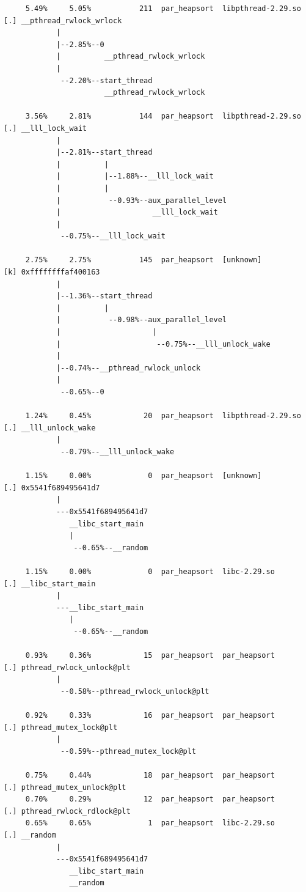 \documentclass{article}
\begin{document}
\begin{verbatim}
     5.49%     5.05%           211  par_heapsort  libpthread-2.29.so  [.] __pthread_rwlock_wrlock
            |
            |--2.85%--0
            |          __pthread_rwlock_wrlock
            |
             --2.20%--start_thread
                       __pthread_rwlock_wrlock

     3.56%     2.81%           144  par_heapsort  libpthread-2.29.so  [.] __lll_lock_wait
            |
            |--2.81%--start_thread
            |          |
            |          |--1.88%--__lll_lock_wait
            |          |
            |           --0.93%--aux_parallel_level
            |                     __lll_lock_wait
            |
             --0.75%--__lll_lock_wait

     2.75%     2.75%           145  par_heapsort  [unknown]           [k] 0xffffffffaf400163
            |
            |--1.36%--start_thread
            |          |
            |           --0.98%--aux_parallel_level
            |                     |
            |                      --0.75%--__lll_unlock_wake
            |
            |--0.74%--__pthread_rwlock_unlock
            |
             --0.65%--0

     1.24%     0.45%            20  par_heapsort  libpthread-2.29.so  [.] __lll_unlock_wake
            |
             --0.79%--__lll_unlock_wake

     1.15%     0.00%             0  par_heapsort  [unknown]           [.] 0x5541f689495641d7
            |
            ---0x5541f689495641d7
               __libc_start_main
               |
                --0.65%--__random

     1.15%     0.00%             0  par_heapsort  libc-2.29.so        [.] __libc_start_main
            |
            ---__libc_start_main
               |
                --0.65%--__random

     0.93%     0.36%            15  par_heapsort  par_heapsort        [.] pthread_rwlock_unlock@plt
            |
             --0.58%--pthread_rwlock_unlock@plt

     0.92%     0.33%            16  par_heapsort  par_heapsort        [.] pthread_mutex_lock@plt
            |
             --0.59%--pthread_mutex_lock@plt

     0.75%     0.44%            18  par_heapsort  par_heapsort        [.] pthread_mutex_unlock@plt
     0.70%     0.29%            12  par_heapsort  par_heapsort        [.] pthread_rwlock_rdlock@plt
     0.65%     0.65%             1  par_heapsort  libc-2.29.so        [.] __random
            |
            ---0x5541f689495641d7
               __libc_start_main
               __random


\end{verbatim}
\end{document}
